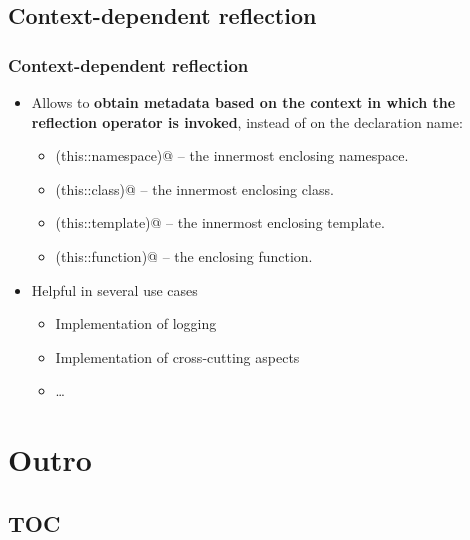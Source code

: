 \documentclass[compress,table,xcolor=table]{beamer}
\begin{document}
\subsection{Context-dependent reflection}
\begin{frame}[fragile]
\frametitle{Context-dependent reflection}
  \begin{itemize}
    \item {\Large Allows to \textbf{obtain metadata based on the context in
      which the reflection operator is invoked}, instead of on the declaration
      name:}
    \begin{itemize}
      \footnotesize
      \item \verb@reflexpr(this::namespace)@ -- the innermost enclosing namespace.
      \item \verb@reflexpr(this::class)@ -- the innermost enclosing class.
      \item \verb@reflexpr(this::template)@ -- the innermost enclosing template.
      \item \verb@reflexpr(this::function)@ -- the enclosing function.
    \end{itemize}
    \item {\large Helpful in several use cases}
    \begin{itemize}
      \small
        \item Implementation of logging
        \item Implementation of cross-cutting aspects
        \item \ldots
    \end{itemize}
  \end{itemize}
\end{frame}

\section{Outro}

\subsection{TOC}
\begin{frame}
\begin{multicols}{2}
  \small
  \tableofcontents
\end{multicols}
\end{frame}
\end{document}
